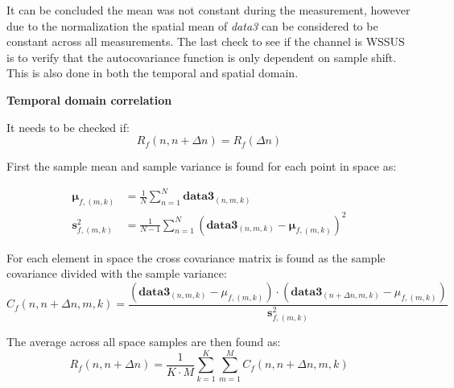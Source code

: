 It can be concluded the mean was not constant during the measurement, however due to the normalization the spatial mean of \textit{data3} can be considered to be constant across all measurements. The last check to see if the channel is \gls{WSSUS} is to verify that the autocovariance function is only dependent on sample shift. This is also done in both the temporal and spatial domain.

\textbf{Temporal domain correlation}

It needs to be checked if:
\begin{equation}\label{eq:autocovariance_check}
R_f(n,n+\Delta n) = R_f(\Delta n) 
\end{equation}
\begin{where}
\end{where}

First the sample mean and sample variance is found for each point in space as:

\begin{align}
\mathbf{\mu}_{f,(m,k)} &= \frac{1}{N}\sum_{n = 1}^{N} \textbf{data3}_{(n,m,k)} \\
\textbf{s}_{f,(m,k)}^2 &= \frac{1}{N-1}\sum_{n = 1}^{N} \left( \textbf{data3}_{(n,m,k)} - \mathbf{\mu}_{f,(m,k)} \right)^2 
\end{align}
\begin{where}
\end{where}

For each element in space the cross covariance matrix is found as the sample covariance divided with the sample variance:
\begin{equation}
C_f(n,n+\Delta n,m,k) = \frac{\left(\textbf{data3}_{(n,m,k)}-\mu_{f,(m,k)}\right)\cdot \left(\textbf{data3}_{(n+\Delta n,m,k)}-\mu_{f,(m,k)}\right)}{\textbf{s}_{f,(m,k)}^2}
\end{equation}
\begin{where}
\end{where}

The average across all space samples are then found as:
\begin{equation}
R_f(n,n+\Delta n) = \frac{1}{K\cdot M}\sum_{k = 1}^{K}\sum_{m = 1}^{M} C_f(n,n+\Delta n,m,k)
\end{equation}


